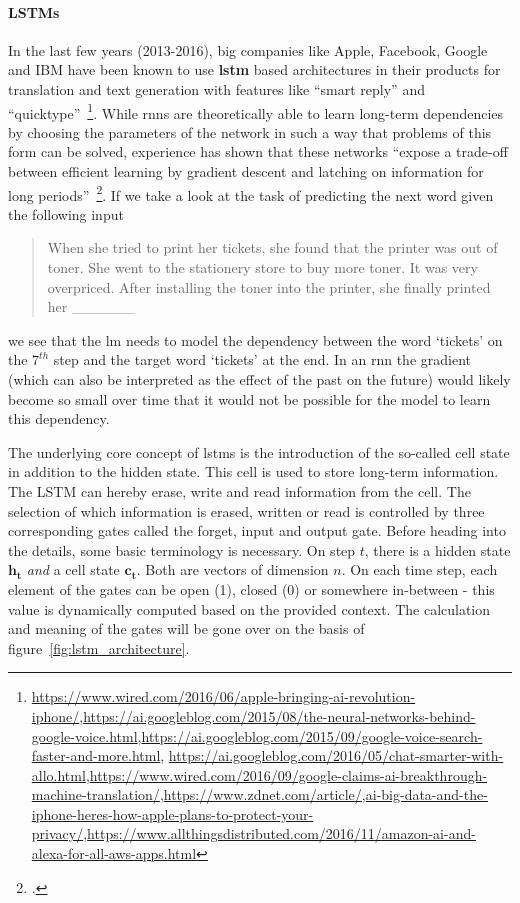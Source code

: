 \paragraph{LSTMs}
In the last few years (2013-2016), big companies like Apple, Facebook, Google and IBM have been known to use \textbf{\gls{lstm}} based architectures in their products for translation and text generation with features like “smart reply” and “quicktype”~\footnote{\url{https://www.wired.com/2016/06/apple-bringing-ai-revolution-iphone/},\url{https://ai.googleblog.com/2015/08/the-neural-networks-behind-google-voice.html},\url{https://ai.googleblog.com/2015/09/google-voice-search-faster-and-more.html}, \url{https://ai.googleblog.com/2016/05/chat-smarter-with-allo.html},\url{https://www.wired.com/2016/09/google-claims-ai-breakthrough-machine-translation/},\url{https://www.zdnet.com/article/},\url{ai-big-data-and-the-iphone-heres-how-apple-plans-to-protect-your-privacy/},\url{https://www.allthingsdistributed.com/2016/11/amazon-ai-and-alexa-for-all-aws-apps.html}}. While \gls{rnn}s are theoretically able to learn long-term dependencies by choosing the parameters of the network in such a way that problems of this form can be solved, experience has shown that these networks ``expose a trade-off between efficient learning by gradient descent and latching on information for long periods''~\footcite[157]{279181}. If we take a look at the task of predicting the next word given the following input
\begin{quote}
	When she tried to print her tickets, she found that the printer was out of toner. She went to the stationery store to buy more toner. It was very overpriced. After installing the toner into the printer, she finally printed her \_\_\_\_\_\_
\end{quote}
we see that the \gls{lm} needs to model the dependency between the word `tickets' on the $ 7^{th} $ step and the target word `tickets' at the end. In an \gls{rnn} the gradient (which can also be interpreted as the effect of the past on the future) would likely become so small over time that it would not be possible for the model to learn this dependency.

The underlying core concept of \gls{lstm}s is the introduction of the so-called cell state in addition to the hidden state. This cell is used to store long-term information. The LSTM can hereby erase, write and read information from the cell. The selection of which information is erased, written or read is controlled by three corresponding gates called the forget, input and output gate. Before heading into the details, some basic terminology is necessary. On step $ t $, there is a hidden state $ \boldsymbol{h_t} $ \textit{and} a cell state $ \boldsymbol{c_t} $. Both are vectors of dimension $ n $. On each time step, each element of the gates can be open (1), closed (0) or somewhere in-between - this value is dynamically computed based on the provided context. The calculation and meaning of the gates will be gone over on the basis of figure~\ref{fig:lstm_architecture}.

